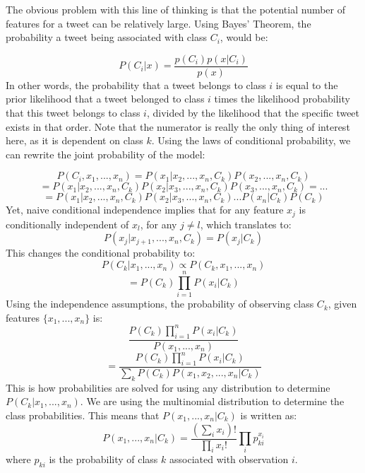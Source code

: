 \documentclass[titlepage, 12pt]{article}
\begin{document}
The obvious problem with this line of thinking is that the potential number of features for a tweet can be relatively large. Using Bayes' Theorem, the probability a tweet being associated with class $C_i$, would be:

\begin{equation}
    P(C_i | x) = \frac{p(C_i)p(x|C_i)}{p(x)}
\end{equation}
In other words, the probability that a tweet belongs to class $i$ is equal to the prior likelihood that a tweet belonged to class $i$ times the likelihood probability that this tweet belongs to class $i$, divided by the likelihood that the specific tweet exists in that order. Note that the numerator is really the only thing of interest here, as it is dependent on class $k$. Using the laws of conditional probability, we can rewrite the joint probability of the model:

\begin{equation}
    P(C_i, x_1, ..., x_n) = P(x_1|x_2, ...,x_n, C_k) P(x_2,...,x_n, C_k)
\end{equation}
\begin{equation}
    =P(x_1|x_2, ..., x_n, C_k)P(x_2|x_3, ..., x_n, C_k)P(x_3, ..., x_n, C_k)=...
\end{equation}
\begin{equation}
    =P(x_1|x_2,..., x_n, C_k)P(x_2|x_3,..., x_n, C_k) ...P(x_n|C_k)P(C_k)
\end{equation}
Yet, naive conditional independence implies that for any feature $x_j$ is conditionally independent of $x_l$, for any $j \neq l$, which translates to:
\begin{equation}
    P(x_j| x_{j+1}, ..., x_n, C_k) = P(x_j|C_k)
\end{equation}
This changes the conditional probability to:
\begin{equation}
    P(C_k|x_1, ..., x_n) \propto P(C_k, x_1, ..., x_n)
\end{equation}
\begin{equation}
    =P(C_k) \prod_{i=1}^{n} P(x_i|C_k)
\end{equation}
Using the independence assumptions, the probability of observing class $C_k$, given features $\{x_1, ..., x_n\}$ is:
\begin{equation}
    \frac{P(C_k) \prod_{i=1}^{n} P(x_i|C_k)}{P(x_1, ..., x_n)}
\end{equation}
\begin{equation}
    =\frac{P(C_k) \prod_{i=1}^{n} P(x_i|C_k)}{\sum_{k}P(C_k)P(x_1, x_2,..., x_n|C_k)}
\end{equation}
This is how probabilities are solved for using any distribution to determine $P(C_k|x_1, ..., x_n)$. We are using the multinomial distribution to determine the class probabilities. This means that $P(x_1, ..., x_n|C_k)$ is written as:
\begin{equation}
    P(x_1, ..., x_n|C_k) = \frac{(\sum_i x_i)!}{\prod_i x_i!}\prod_i p_{ki}^{x_i}
\end{equation}
where $p_{ki}$ is the probability of class $k$ associated with observation $i$.
\end{document}
